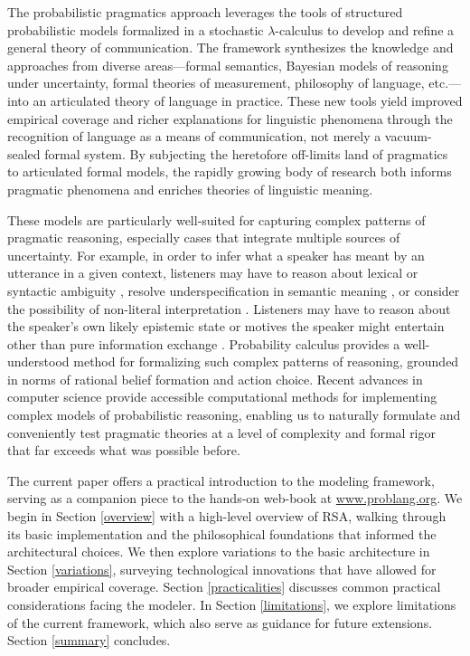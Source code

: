 \documentclass{sp}
\newcommand{\gcs}[1]{\textcolor{blue}{[gcs: #1]}}
\begin{document}
The probabilistic pragmatics approach leverages the tools of structured probabilistic models formalized in a stochastic $\lambda$-calculus to develop and refine a general theory of communication. The framework synthesizes the knowledge and approaches from diverse areas---formal semantics, Bayesian models of reasoning under uncertainty, formal theories of measurement, philosophy of language, etc.---into an articulated theory of language in practice. These new tools yield improved empirical coverage and richer explanations for linguistic phenomena through the recognition of language as a means of communication, not merely a vacuum-sealed formal system. By subjecting the heretofore off-limits land of pragmatics to articulated formal models, the rapidly growing body of research both informs pragmatic phenomena and enriches theories of linguistic meaning.


These models are particularly well-suited for capturing complex patterns of pragmatic reasoning, especially cases that integrate multiple sources of uncertainty. For example, in order to infer what a speaker has meant by an utterance in a given context, listeners may have to reason about lexical or syntactic ambiguity \citep{bergenetal2016,savinellietal2017,FrankeBergen2020:Theory-driven-s}, resolve underspecification in semantic meaning \citep{lassitergoodman2013}, or consider the possibility of non-literal interpretation \citep{kaoetal2014metaphor,kaoetal2014}. Listeners may have to reason about the speaker's own likely epistemic state \citep{goodmanstuhlmuller2013,scontrasgoodman2017,HerbstrittFranke2019:Complex-probabi} or motives the speaker might entertain other than pure information exchange \citep{yoonetal2016,yoonetal2017}. Probability calculus provides a well-understood method for formalizing such complex patterns of reasoning, grounded in norms of rational belief formation and action choice. Recent advances in computer science provide accessible computational methods for implementing complex models of probabilistic reasoning, enabling us to naturally formulate and conveniently test pragmatic theories at a level of complexity and formal rigor that far exceeds what was possible before.

The current paper offers a practical introduction to the modeling framework, serving as a companion piece to the hands-on web-book at \href{https://www.problang.org}{www.problang.org}. We begin in Section \ref{overview} with a high-level overview of RSA, walking through its basic implementation and the philosophical foundations that informed the architectural choices. We then explore variations to the basic architecture in Section \ref{variations}, surveying technological innovations that have allowed for broader empirical coverage. Section \ref{practicalities} discusses common practical considerations facing the modeler. In Section \ref{limitations}, we explore limitations of the current framework, which also serve as guidance for future extensions. Section \ref{summary} concludes.
\end{document}
